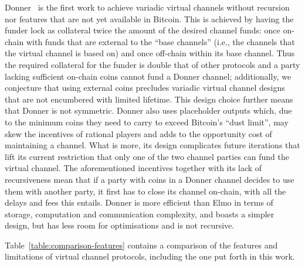   Donner~\cite{donner} is the first work to achieve variadic
  virtual channels without recursion nor features that are not yet
  available in Bitcoin. This is achieved by having the funder lock as
  collateral twice the amount of the desired channel funds: once on-chain with
  funds that are external to the ``base channels'' (i.e., the channels that the
  virtual channel is based on) and once off-chain within its base channel. Thus
  the required collateral for the funder is double that of other protocols and
  a party lacking sufficient on-chain coins cannot fund a Donner channel;
  additionally, we conjecture that using external coins precludes variadic
  virtual channel designs that are not encumbered with limited lifetime. This
  design choice further means that Donner is not symmetric. Donner also uses
  placeholder outputs which, due to the minimum coins they need to carry to
  exceed Bitcoin's ``dust limit'', may skew the incentives of rational players
  and adds to the
  opportunity cost of maintaining a channel. What is more, its design complicates
  future iterations that lift its current restriction that only one of the two
  channel parties can fund the virtual channel. The aforementioned incentives
  together with its lack of recursiveness mean that if a party with coins in a
  Donner channel decides to use them with another party, it first has to close
  its channel on-chain, with all the delays and fees this entails. Donner is
  more efficient than Elmo in terms of storage, computation and communication
  complexity, and boasts a simpler design, but has less room for optimisations
  and is not recursive.

  Table~\ref{table:comparison-features} contains a comparison of the
  features and limitations of virtual channel protocols, including the one put
  forth in this work.

